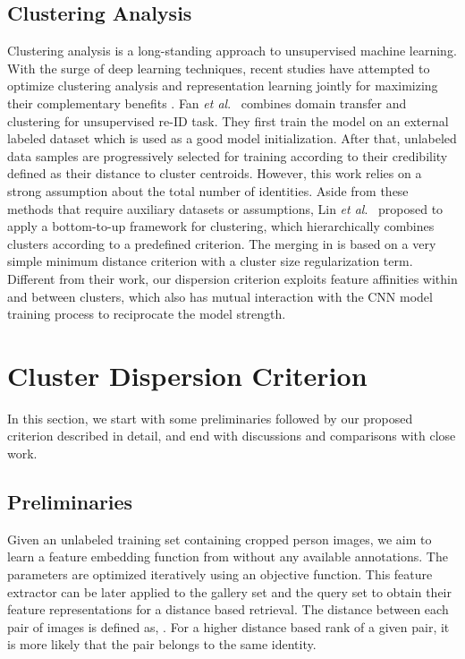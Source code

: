\documentclass[journal]{IEEEtran}
\newcommand{\etal}{\textit{et al}.}
\begin{document}
\subsection{Clustering Analysis} Clustering analysis is a long-standing approach to unsupervised machine learning. With the surge of deep learning techniques, recent studies have attempted to optimize clustering analysis and representation learning jointly for maximizing their complementary benefits \cite{caron2018deep,ghasedi2017deep,xie2016unsupervised,yang2017towards}. Fan \etal\ \cite{fan2018unsupervised} combines domain transfer and clustering for unsupervised re-ID task. They first train the model on an external labeled dataset which is used as a good model initialization. After that, unlabeled data samples are progressively selected for training according to their credibility defined as their distance to cluster centroids. However, this work relies on a strong assumption about the total number of identities. Aside from these methods that require auxiliary datasets or assumptions, Lin \etal\ \cite{lin2019bottom} proposed to apply a bottom-to-up framework for clustering, which  hierarchically combines clusters according to a predefined criterion. The merging in \cite{lin2019bottom} is based on a very simple minimum distance criterion with a cluster size regularization term. Different from their work, our dispersion criterion exploits feature affinities within and between clusters, which also has mutual interaction with the CNN model training process to reciprocate the model strength.

\section{Cluster Dispersion Criterion}
\label{sec:approach}
In this section, we start with some preliminaries  followed by our proposed criterion described in detail, and end with  discussions and comparisons with close work.

\subsection{Preliminaries}
Given an unlabeled training set  containing  cropped person images, we aim to learn a feature embedding function  from  without any available annotations. The parameters  are optimized iteratively using an objective function. This feature extractor can be later applied to the gallery set  and the query set  to obtain their feature representations for a distance based retrieval. The distance between each pair of images is defined as, . For a higher distance based rank of a given pair, it is more likely that the pair belongs to the same identity. 
\end{document}
